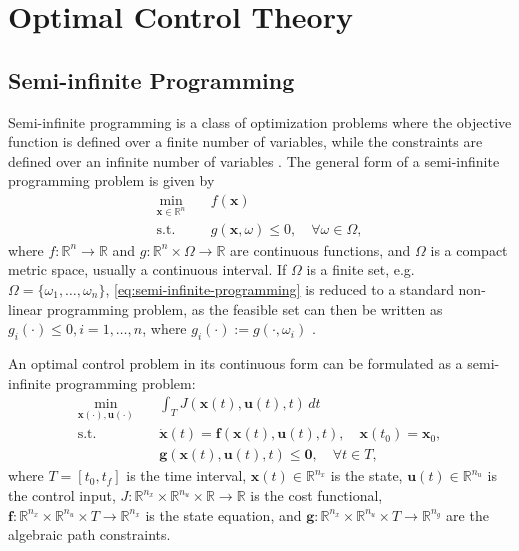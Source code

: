 
\chapter{Optimal Control Theory}\label{chap:optimal-control-theory}

\section{Semi-infinite Programming}\label{sec:semi-infinite-programming}

Semi-infinite programming is a class of optimization problems where the objective function is defined over a finite number of variables, while the constraints are defined over an infinite number of variables \citep{Bonnans2013-gt}. The general form of a semi-infinite programming problem is given by
\begin{equation}\label{eq:semi-infinite-programming}
    \begin{aligned}
        \min_{\mathbf x \in \mathbb R^n} \quad & f(\mathbf x) \\
        \text{s.t.} \quad & g(\mathbf x, \omega) \leq 0, \quad \forall \omega \in \Omega,
    \end{aligned}
\end{equation}
where $f : \mathbb R^n \to \mathbb R$ and $g : \mathbb R^n \times \Omega \to \mathbb R$ are continuous functions, and $\Omega$ is a compact metric space, usually a continuous interval. If $\Omega$ is a finite set, e.g. $\Omega = \{\omega_1,\ldots,\omega_n\}$, \cref{eq:semi-infinite-programming} is reduced to a standard non-linear programming problem, as the feasible set can then be written as $g_i(\cdot) \leq 0, i = 1,\ldots,n$, where $g_i(\cdot) := g(\cdot, \omega_i)$ \citep{Bonnans2013-gt}.

An optimal control problem in its continuous form can be formulated as a semi-infinite programming problem:
\begin{equation}\label{eq:optimal-control-problem}
    \begin{aligned}
        \min_{\mathbf{x}(\cdot), \mathbf{u}(\cdot)} \quad & \int_{T} J(\mathbf{x}(t), \mathbf{u}(t), t) \, dt \\
        \text{s.t.} \quad & \dot{\mathbf{x}}(t) = \mathbf f(\mathbf{x}(t), \mathbf{u}(t), t), \quad \mathbf{x}(t_0) = \mathbf{x}_0, \\
        & \mathbf g(\mathbf{x}(t), \mathbf{u}(t), t) \leq \mathbf 0, \quad \forall t \in T,
    \end{aligned}
\end{equation}
where $T = [t_0, t_f]$ is the time interval, $\mathbf{x}(t) \in \mathbb R^{n_x}$ is the state, $\mathbf{u}(t) \in \mathbb R^{n_u}$ is the control input, $J : \mathbb R^{n_x} \times \mathbb R^{n_u} \times \mathbb R \to \mathbb R$ is the cost functional, $\mathbf f : \mathbb R^{n_x} \times \mathbb R^{n_u} \times T \to \mathbb R^{n_x}$ is the state equation, and $\mathbf g : \mathbb R^{n_x} \times \mathbb R^{n_u} \times T \to \mathbb R^{n_g}$ are the algebraic path constraints.

